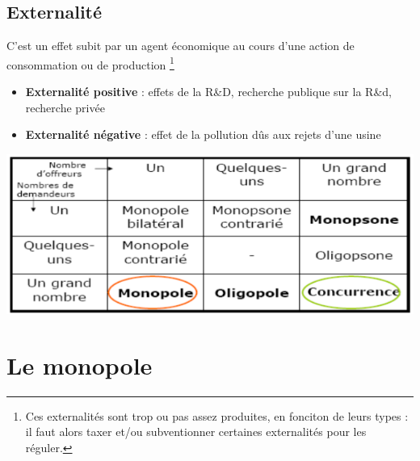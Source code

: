 \subsection{Externalité}
C'est un effet subit par un agent économique au cours d'une action de consommation ou de production \footnote{Ces externalités sont trop ou pas assez produites, en fonciton de leurs types : il faut alors taxer et/ou subventionner certaines externalités pour les réguler.}
\begin{itemize}
    \item \textbf{Externalité positive} : effets de la R\&D, recherche publique sur la R\&d, recherche privée
    \item \textbf{Externalité négative} : effet de la pollution dûs aux rejets d'une usine
\end{itemize}
\begin{center}
    \includegraphics[scale=0.7]{Pics/defaillance_marche.png}
\end{center}
\newpage
\section{Le monopole}
